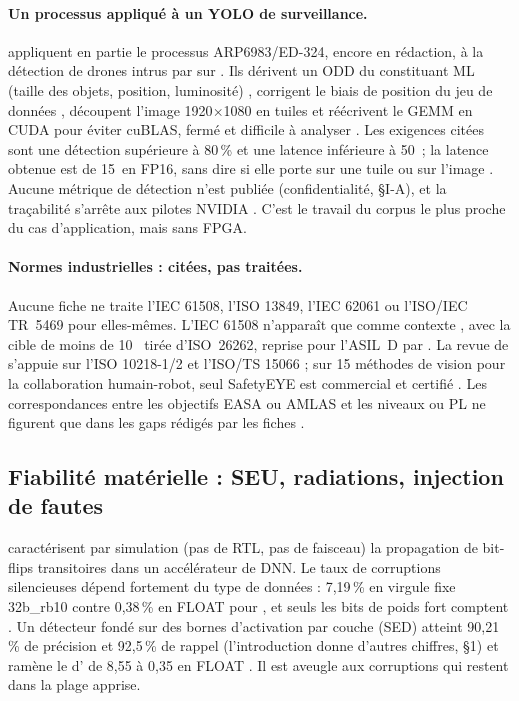 \paragraph{Un processus appliqué à un YOLO de surveillance.}
\citet{arxiv-2406.12362-certified-ml-object-detection-surveillance} appliquent en partie le
processus ARP6983/ED-324, encore en rédaction, à la détection de drones intrus par
 sur . Ils dérivent un ODD du constituant ML (taille des
objets, position, luminosité) , corrigent le biais de position du jeu de données
, découpent l'image 1920$\times$1080 en tuiles  et réécrivent le
GEMM en CUDA pour éviter cuBLAS, fermé et difficile à analyser . Les exigences
citées sont une détection supérieure à 80\,\% et une latence inférieure à 50\,
 ; la latence obtenue est de 15\, en FP16, sans dire si elle porte sur une tuile
ou sur l'image . Aucune métrique de détection n'est publiée (confidentialité,
§I-A), et la traçabilité s'arrête aux pilotes NVIDIA . C'est le travail du corpus
le plus proche du cas d'application, mais sans FPGA.

\paragraph{Normes industrielles : citées, pas traitées.} Aucune fiche ne traite l'IEC 61508,
l'ISO 13849, l'IEC 62061 ou l'ISO/IEC TR~5469 pour elles-mêmes. L'IEC 61508 n'apparaît que
comme contexte \citep[§1, §2.3]{2017-li-understanding-error-propagation-deep-learning},
avec la cible de moins de 10~ tirée d'ISO~26262, reprise pour l'ASIL~D par
\citet[§III-C]{2024-rech-artificial-neural-networks-space-safety}. La revue de
\citet{2018-halme-review-vision-safety-systems-human} s'appuie sur l'ISO 10218-1/2 et
l'ISO/TS 15066  ; sur 15 méthodes de vision pour la collaboration humain-robot,
seul SafetyEYE est commercial et certifié . Les correspondances entre les
objectifs EASA ou AMLAS et les niveaux  ou PL ne figurent que dans les gaps rédigés par
les fiches \deduit.

\subsection{Fiabilité matérielle : SEU, radiations, injection de fautes}

\citet{2017-li-understanding-error-propagation-deep-learning} caractérisent par simulation
(pas de RTL, pas de faisceau) la propagation de bit-flips transitoires dans un accélérateur
de DNN. Le taux de corruptions silencieuses dépend fortement du type de données : 7,19\,\%
en virgule fixe 32b\_rb10 contre 0,38\,\% en FLOAT pour  , et seuls les
bits de poids fort comptent . Un détecteur fondé sur des bornes d'activation par
couche (SED) atteint 90,21\,\% de précision et 92,5\,\% de rappel  (l'introduction
donne d'autres chiffres, §1) et ramène le  d' de 8,55 à 0,35 en FLOAT
. Il est aveugle aux corruptions qui restent dans la plage apprise.

